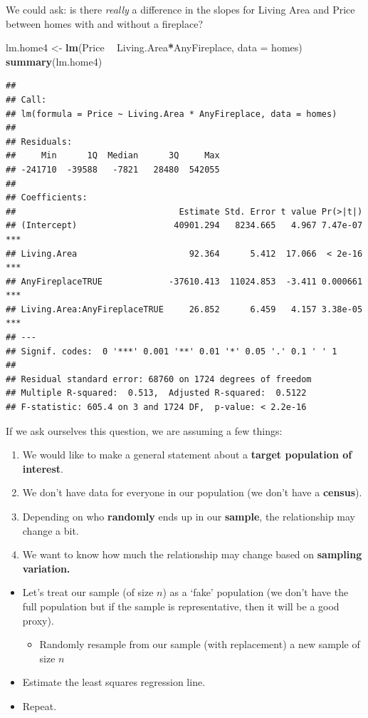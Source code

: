 \documentclass[]{book}
\newenvironment{Shaded}{\begin{snugshade}}{\end{snugshade}}
\newcommand{\DataTypeTok}[1]{\textcolor[rgb]{0.13,0.29,0.53}{#1}}
\newcommand{\KeywordTok}[1]{\textcolor[rgb]{0.13,0.29,0.53}{\textbf{#1}}}
\newcommand{\NormalTok}[1]{#1}
\newcommand{\OperatorTok}[1]{\textcolor[rgb]{0.81,0.36,0.00}{\textbf{#1}}}
\newcommand{\StringTok}[1]{\textcolor[rgb]{0.31,0.60,0.02}{#1}}
\providecommand{\tightlist}{%
  \setlength{\itemsep}{0pt}\setlength{\parskip}{0pt}}
\begin{document}
We could ask: is there \emph{really} a difference in the slopes for Living Area and Price between homes with and without a fireplace?

\begin{Shaded}
\begin{Highlighting}[]
\NormalTok{lm.home4 <-}\StringTok{ }\KeywordTok{lm}\NormalTok{(Price }\OperatorTok{~}\StringTok{ }\NormalTok{Living.Area}\OperatorTok{*}\NormalTok{AnyFireplace, }\DataTypeTok{data =}\NormalTok{ homes) }
\KeywordTok{summary}\NormalTok{(lm.home4)}
\end{Highlighting}
\end{Shaded}

\begin{verbatim}
## 
## Call:
## lm(formula = Price ~ Living.Area * AnyFireplace, data = homes)
## 
## Residuals:
##     Min      1Q  Median      3Q     Max 
## -241710  -39588   -7821   28480  542055 
## 
## Coefficients:
##                                Estimate Std. Error t value Pr(>|t|)    
## (Intercept)                   40901.294   8234.665   4.967 7.47e-07 ***
## Living.Area                      92.364      5.412  17.066  < 2e-16 ***
## AnyFireplaceTRUE             -37610.413  11024.853  -3.411 0.000661 ***
## Living.Area:AnyFireplaceTRUE     26.852      6.459   4.157 3.38e-05 ***
## ---
## Signif. codes:  0 '***' 0.001 '**' 0.01 '*' 0.05 '.' 0.1 ' ' 1
## 
## Residual standard error: 68760 on 1724 degrees of freedom
## Multiple R-squared:  0.513,  Adjusted R-squared:  0.5122 
## F-statistic: 605.4 on 3 and 1724 DF,  p-value: < 2.2e-16
\end{verbatim}

If we ask ourselves this question, we are assuming a few things:

\begin{enumerate}
\def\labelenumi{\arabic{enumi}.}
\item
  We would like to make a general statement about a \textbf{target population of interest}.
\item
  We don't have data for everyone in our population (we don't have a \textbf{census}).
\item
  Depending on who \textbf{randomly} ends up in our \textbf{sample}, the relationship may change a bit.
\item
  We want to know how much the relationship may change based on \textbf{sampling variation.}
\end{enumerate}

\begin{itemize}
\tightlist
\item
  Let's treat our sample (of size \(n\)) as a `fake' population (we don't have the full population but if the sample is representative, then it will be a good proxy).

  \begin{itemize}
  \tightlist
  \item
    Randomly resample from our sample (with replacement) a new sample of size \(n\)
  \end{itemize}
\item
  Estimate the least squares regression line.
\item
  Repeat.
\end{itemize}
\end{document}
